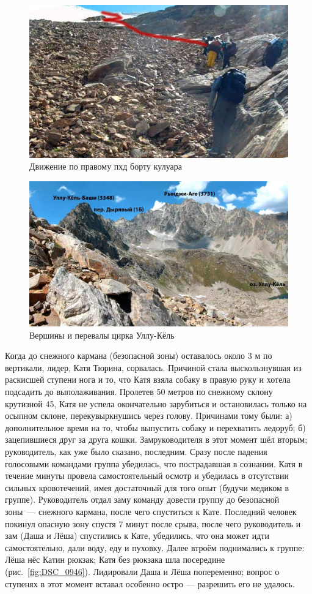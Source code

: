 \begin{figure}[h!]
	\centering
	\includegraphics[width=0.7\linewidth]{../pics/20aug3.jpg}
	\caption{Движение по правому пхд борту кулуара}
	\label{fig:20aug3.jpg}
\end{figure}

\begin{figure}[h!]
	\centering
	\includegraphics[width=0.7\linewidth]{../pics/20aug4.jpg}
	\caption{Вершины и перевалы цирка Уллу-Кёль}
	\label{fig:20aug4.jpg}
\end{figure}

Когда до снежного кармана (безопасной зоны) оставалось около 3 м по вертикали, лидер, Катя Тюрина, сорвалась. Причиной стала выскользнувшая из раскисшей ступени нога и то, что Катя взяла собаку в правую руку и хотела подсадить до выполаживания. Пролетев 50 метров по снежному склону крутизной 45\degree, Катя не успела окончательно зарубиться и остановилась только на осыпном склоне, перекувыркнушись через голову. Причинами тому были: а) дополнительное время на то, чтобы выпустить собаку и перехватить ледоруб; б) зацепившиеся друг за друга кошки. Замруководителя в этот момент шёл вторым; руководитель, как уже было сказано, последним. Сразу после падения голосовыми командами группа убедилась, что пострадавшая в сознании. Катя в течение минуты провела самостоятельный осмотр и убедилась в отсутствии сильных кровотечений, имея достаточный для того опыт (будучи медиком в группе). Руководитель отдал заму команду довести группу до безопасной зоны~--- снежного кармана, после чего спуститься к Кате. Последний человек покинул опасную зону спустя 7 минут после срыва, после чего руководитель и зам (Даша и Лёша) спустились к Кате, убедились, что она может идти самостоятельно, дали воду, еду и пуховку. Далее втроём поднимались к группе: Лёша нёс Катин рюкзак; Катя без рюкзака шла посередине (рис.~\ref{fig:DSC_0946}). Лидировали Даша и Лёша попеременно; вопрос о ступенях в этот момент вставал особенно остро --- разрешить его не удалось. 


